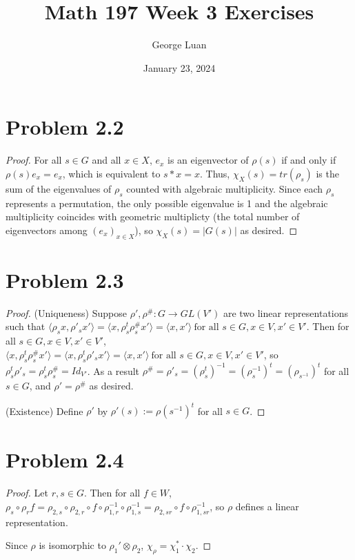 \documentclass{article}
\title{Math 197 Week 3 Exercises}
\author{George Luan}
\date{January 23, 2024} %
\begin{document}
\maketitle

\section*{Problem 2.2}
\begin{proof}
    For all $s\in G$ and all $x \in X$, $e_{x}$ is an eigenvector of $\rho(s)$ if and only if $\rho(s)e_{x} = e_{x}$, which is equivalent to $s*x = x$. Thus, $\chi_{X}(s) = tr(\rho_s)$ is the sum of the eigenvalues of $\rho_{s}$ counted with algebraic multiplicity. Since each $\rho_s$ represents a permutation, the only possible eigenvalue is 1 and the algebraic multiplicity coincides with geometric multiplicty (the total number of eigenvectors among $(e_{x})_{x \in X}$), so $\chi_{X}(s) = |G(s)|$ as desired.  
\end{proof}

\section*{Problem 2.3}
\begin{proof}
(Uniqueness) Suppose $\rho', \rho^\#: G \to GL(V')$ are two linear representations such that $\langle \rho_s x, \rho'_s x'\rangle = \langle x, \rho_s^{t}\rho^\#_s x'\rangle = \langle x, x' \rangle \ \text{for all } s \in G, x \in V, x' \in V'$.
Then for all $s \in G, x \in V, x' \in V'$, $\langle x, \rho_s^{t}\rho^{\#}_s x'\rangle = \langle x, \rho_s^{t}\rho'_s x'\rangle = \langle x, x' \rangle \ \text{for all } s \in G, x \in V, x' \in V'$, so $\rho_s^{t}\rho'_s = \rho_s^{t}\rho^\#_s = Id_{V'}$. As a result $\rho^\# = \rho'_s = (\rho_s^{t})^{-1} = (\rho_s^{-1})^{t} = (\rho_{s^{-1}})^{t}$ for all $s \in G$, and $\rho' = \rho^\#$ as desired.

(Existence) Define $\rho'$ by $\rho'(s) := \rho(s^{-1})^t$ for all $s \in G$.
\end{proof}


\section*{Problem 2.4}
\begin{proof}
    Let $r, s \in G$. Then for all $f \in W$, $\rho_s\circ\rho_r f = \rho_{2, s} \circ \rho_{2, r} \circ f \circ \rho_{1, r}^{-1} \circ \rho_{1, s}^{-1} = \rho_{2, sr} \circ f \circ \rho_{1, sr}^{-1}$, so $\rho$ defines a linear representation.

    Since $\rho$ is isomorphic to $\rho_1' \otimes \rho_2$, $\chi_\rho = \chi_{1}^* \cdot \chi_2$.
\end{proof}
\end{document}
